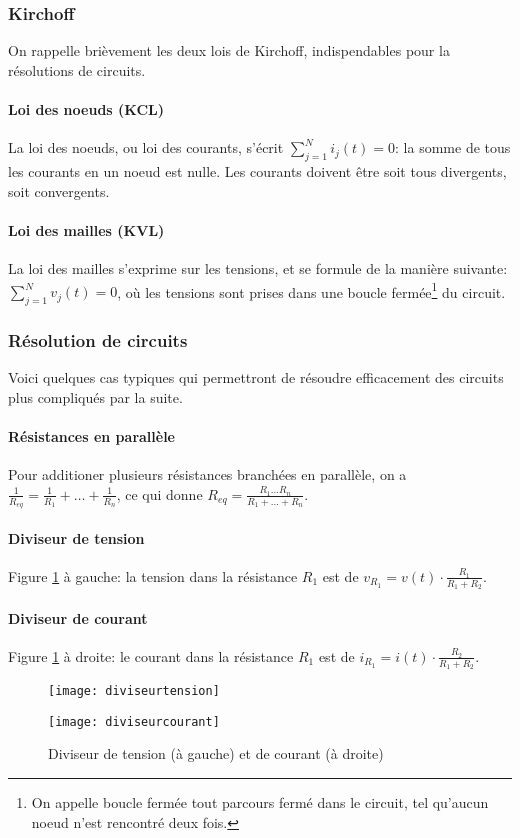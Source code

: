 \subsubsection{Kirchoff}
On rappelle brièvement les deux lois de Kirchoff, indispendables pour la résolutions de circuits.
\paragraph{Loi des noeuds (KCL)}
La loi des noeuds, ou loi des courants, s'écrit $\sum^{N}_{j=1}i_j(t) = 0$: la somme de tous les courants en un noeud est nulle. Les courants doivent être soit tous divergents, soit convergents.
\paragraph{Loi des mailles (KVL)}
La loi des mailles s'exprime sur les tensions, et se formule de la manière suivante: $\sum^N_{j=1}v_j(t) = 0$, où les tensions sont prises dans une boucle fermée\footnote{On appelle boucle fermée tout parcours fermé dans le circuit, tel qu'aucun noeud n'est rencontré deux fois.} du circuit.
\subsubsection{Résolution de circuits}
Voici quelques cas typiques qui permettront de résoudre efficacement des circuits plus compliqués par la suite.
\paragraph{Résistances en parallèle}
Pour additioner plusieurs résistances branchées en parallèle, on a $\frac{1}{R_{eq}} = \frac{1}{R_1} + \dots + \frac{1}{R_n}$, ce qui donne $R_{eq} = \frac{R_1\ldots R_n}{R_1+\ldots+R_n}.$
\paragraph{Diviseur de tension}
Figure \ref{diviseurs} à gauche: la tension dans la résistance $R_1$ est de $v_{R_1} = v(t)\cdot\frac{R_1}{R_1+R_2}.$
\paragraph{Diviseur de courant}
Figure \ref{diviseurs} à droite: le courant dans la résistance $R_1$ est de $i_{R_1} = i(t)\cdot\frac{R_2}{R_1+R_2}.$
\begin{figure}[H]
\centering
\begin{minipage}{.23\linewidth}
\texttt{[image: diviseurtension]}
\end{minipage}
\qquad \qquad \qquad
\begin{minipage}{.5\linewidth}
\texttt{[image: diviseurcourant]}
\end{minipage}
\caption{Diviseur de tension (à gauche) et de courant (à droite)}
\label{diviseurs}
\end{figure}

